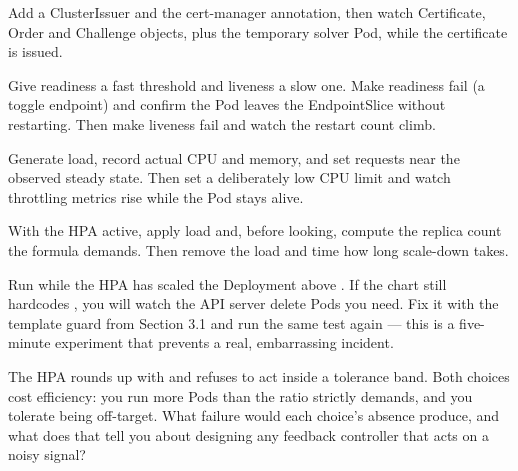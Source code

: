 Add a ClusterIssuer and the cert-manager annotation, then watch Certificate, Order and Challenge objects, plus the temporary solver Pod, while the certificate is issued.

Give readiness a fast threshold and liveness a slow one. Make readiness fail (a toggle endpoint) and confirm the Pod leaves the EndpointSlice without restarting. Then make liveness fail and watch the restart count climb.

Generate load, record actual CPU and memory, and set requests near the observed steady state. Then set a deliberately low CPU limit and watch throttling metrics rise while the Pod stays alive.

With the HPA active, apply load and, before looking, compute the replica count the formula demands. Then remove the load and time how long scale-down takes.

\begin{prodtip}
Run  while the HPA has scaled the Deployment above . If the chart still hardcodes , you will watch the API server delete Pods you need. Fix it with the template guard from Section 3.1 and run the same test again --- this is a five-minute experiment that prevents a real, embarrassing incident.
\end{prodtip}


\begin{thinkbox}
The HPA rounds up with  and refuses to act inside a tolerance band. Both choices cost efficiency: you run more Pods than the ratio strictly demands, and you tolerate being off-target. What failure would each choice's absence produce, and what does that tell you about designing any feedback controller that acts on a noisy signal?
\end{thinkbox}

